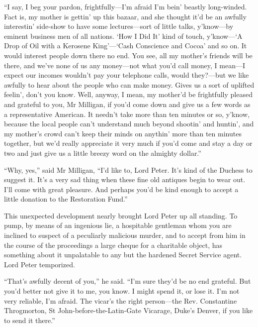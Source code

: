 \enquote{I say, I beg your pardon, frightfully\allowbreak---\allowbreak I’m afraid I’m bein’ beastly long-winded. Fact is, my mother is gettin’ up this bazaar, and she thought it’d be an awfully interestin’ side-show to have some lectures\allowbreak---\allowbreak sort of little talks, y’know\allowbreak---\allowbreak by eminent business men of all nations. \enquote{How I Did It} kind of touch, y’know---\enquote{A Drop of Oil with a Kerosene King}---\enquote{Cash Conscience and Cocoa} and so on. It would interest people down there no end. You see, all my mother’s friends will be there, and we’ve none of us any money\allowbreak---\allowbreak not what you’d call money, I mean\allowbreak---\allowbreak I expect our incomes wouldn’t pay your telephone calls, would they?---but we like awfully to hear about the people who can make money. Gives us a sort of uplifted feelin’, don’t you know. Well, anyway, I mean, my mother’d be frightfully pleased and grateful to you, Mr Milligan, if you’d come down and give us a few words as a representative American. It needn’t take more than ten minutes or so, y’know, because the local people can’t understand much beyond shootin’ and huntin’, and my mother’s crowd can’t keep their minds on anythin’ more than ten minutes together, but we’d really appreciate it very much if you’d come and stay a day or two and just give us a little breezy word on the almighty dollar.}

\enquote{Why, yes,} said Mr Milligan, \enquote{I’d like to, Lord Peter. It’s kind of the Duchess to suggest it. It’s a very sad thing when these fine old antiques begin to wear out. I’ll come with great pleasure. And perhaps you’d be kind enough to accept a little donation to the Restoration Fund.}

This unexpected development nearly brought Lord Peter up all standing. To pump, by means of an ingenious lie, a hospitable gentleman whom you are inclined to suspect of a peculiarly malicious murder, and to accept from him in the course of the proceedings a large cheque for a charitable object, has something about it unpalatable to any but the hardened Secret Service agent. Lord Peter temporized.

\enquote{That’s awfully decent of you,} he said. \enquote{I’m sure they’d be no end grateful. But you’d better not give it to me, you know. I might spend it, or lose it. I’m not very reliable, I’m afraid. The vicar’s the right person\allowbreak---\allowbreak the Rev. Constantine Throgmorton, St John-before-the-Latin-Gate Vicarage, Duke’s Denver, if you like to send it there.}

